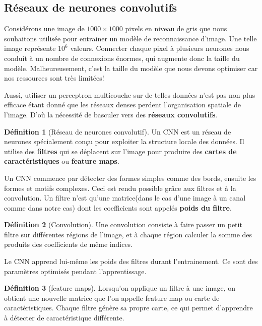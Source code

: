 \documentclass[a4paper,12pt,twoside]{report}
\theoremstyle{definition}
\newtheorem{defi}{Définition}
\theoremstyle{plain}
\theoremstyle{remark}
\begin{document}
\subsection{Réseaux de neurones convolutifs}
Considérons une image de $1000 \times 1000$ pixels en niveau de gris que nous souhaitons utilisée pour entrainer un modèle de reconnaissance d'image. Une telle image représente $10^6$ valeurs. Connecter chaque pixel à plusieurs neurones nous conduit à un nombre de connexions énormes, qui augmente donc la taille du modèle. Malheureusement, c'est la taille du modèle que nous devons optimiser car nos ressources sont très limitées!

Aussi, utiliser un perceptron multicouche sur de telles données n'est pas non plus efficace étant donné que les réseaux denses perdent l'organisation spatiale de l'image. D'où la nécessité de basculer vers des \textbf{réseaux convolutifs}.

\begin{defi}[Réseau de neurones convolutif]
	Un \ac{CNN} est un réseau de neurones spécialement conçu pour exploiter la structure locale des données. Il utilise des \textbf{filtres} qui se déplacent sur l'image pour produire des \textbf{cartes de caractéristiques} ou \textbf{feature maps}.
\end{defi}

Un \ac{CNN} commence par détecter des formes simples comme des bords, ensuite les formes et motifs complexes. Ceci est rendu possible grâce aux filtres et à la convolution. Un filtre n'est qu'une matrice(dans le cas d'une image à un canal comme dans notre cas) dont les coefficients sont appelés \textbf{poids du filtre}.

\begin{defi}[Convolution]
	Une convolution consiste à faire passer un petit filtre sur différentes régions de l'image, et à chaque région calculer la somme des produits des coefficients de même indices.
\end{defi}

Le \ac{CNN} apprend lui-même les poids des filtres durant l'entrainement. Ce sont des paramètres optimisés pendant l'apprentissage.

\begin{defi}[feature maps]
	Lorsqu'on applique un filtre à une image, on obtient une nouvelle matrice que l'on appelle feature map ou carte de caractéristiques. Chaque filtre génère sa propre carte, ce qui permet d'apprendre à détecter de caractéristique différente.
\end{defi}
\end{document}

